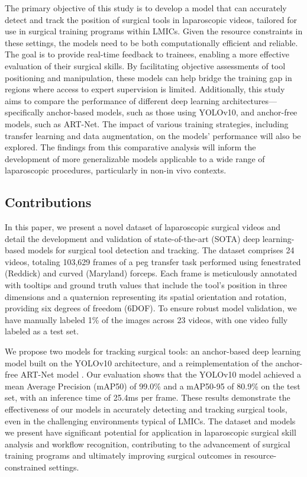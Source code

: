 The primary objective of this study is to develop a model that can accurately detect and track the position of surgical tools in laparoscopic videos, tailored for use in surgical training programs within LMICs. Given the resource constraints in these settings, the models need to be both computationally efficient and reliable. The goal is to provide real-time feedback to trainees, enabling a more effective evaluation of their surgical skills. By facilitating objective assessments of tool positioning and manipulation, these models can help bridge the training gap in regions where access to expert supervision is limited. Additionally, this study aims to compare the performance of different deep learning architectures—specifically anchor-based models, such as those using YOLOv10, and anchor-free models, such as ART-Net. The impact of various training strategies, including transfer learning and data augmentation, on the models' performance will also be explored. The findings from this comparative analysis will inform the development of more generalizable models applicable to a wide range of laparoscopic procedures, particularly in non-in vivo contexts.

\subsection{Contributions}

In this paper, we present a novel dataset of laparoscopic surgical videos and detail the development and validation of state-of-the-art (SOTA) deep learning-based models for surgical tool detection and tracking. The dataset comprises 24 videos, totaling 103,629 frames of a peg transfer task performed using fenestrated (Reddick) and curved (Maryland) forceps. Each frame is meticulously annotated with tooltips and ground truth values that include the tool's position in three dimensions and a quaternion representing its spatial orientation and rotation, providing six degrees of freedom (6DOF). To ensure robust model validation, we have manually labeled 1\% of the images across 23 videos, with one video fully labeled as a test set.

We propose two models for tracking surgical tools: an anchor-based deep learning model built on the YOLOv10 architecture, and a reimplementation of the anchor-free ART-Net model \cite{hasan_detection_2021}. Our evaluation shows that the YOLOv10 model achieved a mean Average Precision (mAP50) of 99.0\% and a mAP50-95 of 80.9\% on the test set, with an inference time of 25.4ms per frame. These results demonstrate the effectiveness of our models in accurately detecting and tracking surgical tools, even in the challenging environments typical of LMICs. The dataset and models we present have significant potential for application in laparoscopic surgical skill analysis and workflow recognition, contributing to the advancement of surgical training programs and ultimately improving surgical outcomes in resource-constrained settings.

